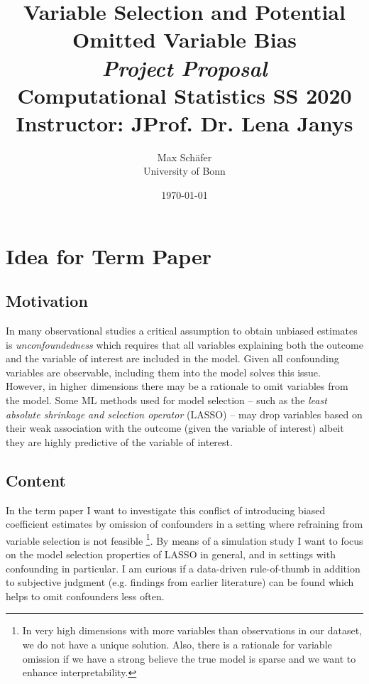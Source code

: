 \documentclass[11pt, a4paper, leqno]{article}
\numberwithin{equation}{section}
\numberwithin{figure}{section}
\numberwithin{table}{section}
\begin{document}
\title{Variable Selection and Potential Omitted Variable Bias \\ \textit{Project Proposal}  \\[0.2em]\smaller{}Computational Statistics SS 2020 \\ Instructor: JProf. Dr. Lena Janys}


\author{Max Schäfer \\[0.2em]\smaller{}University of Bonn}

\date{\today}

\maketitle

\section{Idea for Term Paper} %

\subsection{Motivation}
In many observational studies a critical assumption to obtain unbiased estimates is \textit{unconfoundedness} which requires that all variables explaining both the outcome and the variable of interest are included in the model. Given all confounding variables are observable, including them into the model solves this issue. However, in higher dimensions there may be a rationale to omit variables from the model. Some ML methods used for model selection -- such as the \textit{least absolute shrinkage and selection operator} (LASSO) -- may drop variables based on their weak association with the outcome (given the variable of interest) albeit they are highly predictive of the variable of interest. 

\subsection{Content}

In the term paper I want to investigate this conflict of introducing biased coefficient estimates by omission of confounders in a setting where refraining from variable selection is not feasible \footnote{In very high dimensions with more variables than observations in our dataset, we do not have a unique solution. Also, there is a rationale for variable omission if we have a strong believe the true model is sparse and we want to enhance interpretability.}. By means of a simulation study I want to focus on the model selection properties of LASSO in general, and in settings with confounding in particular. I am curious if a data-driven rule-of-thumb in addition to subjective judgment (e.g. findings from earlier literature) can be found which helps to omit confounders less often.
\end{document}
